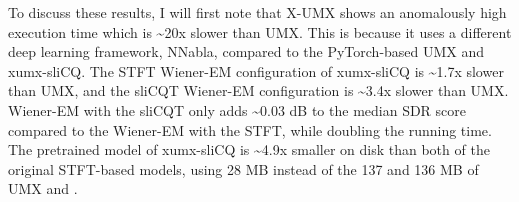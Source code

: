 \documentclass[report.tex]{subfiles}
\begin{document}
To discuss these results, I will first note that X-UMX shows an anomalously high execution time which is \textasciitilde20x slower than UMX. This is because it uses a different deep learning framework, NNabla, compared to the PyTorch-based UMX and xumx-sliCQ. The STFT Wiener-EM configuration of xumx-sliCQ is \textasciitilde1.7x slower than UMX, and the sliCQT Wiener-EM configuration is \textasciitilde3.4x slower than UMX. Wiener-EM with the sliCQT only adds \textasciitilde0.03 dB to the median SDR score compared to the Wiener-EM with the STFT, while doubling the running time. The pretrained model of xumx-sliCQ is \textasciitilde4.9x smaller on disk than both of the original STFT-based models, using 28 MB instead of the 137 and 136 MB of UMX and .
\end{document}
